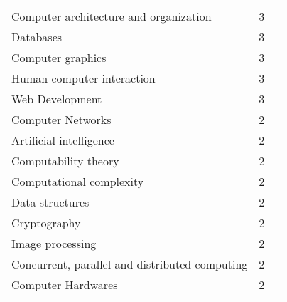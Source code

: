 \begin{table}[ht]
\begin{tabular}{l c p{4cm}}
		Computer architecture and organization & 3 \\
		Databases & 3 \\
		Computer graphics & 3 \\
		Human-computer interaction & 3 \\
		Web Development & 3 \\
		Computer Networks & 2 \\
		Artificial intelligence & 2 \\
		Computability theory & 2 \\
		Computational complexity & 2 \\
		Data structures & 2 \\
		Cryptography & 2 \\
		Image processing & 2 \\
		Concurrent, parallel and distributed computing & 2 \\
		Computer Hardwares & 2 \\

\end{tabular}
\end{table}
